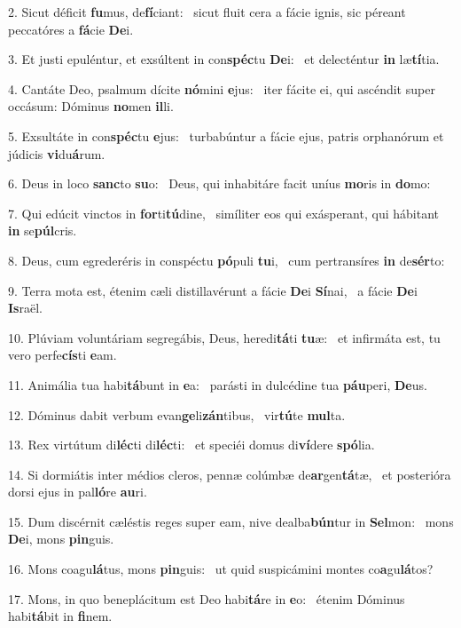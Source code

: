 2. Sicut déficit \textbf{fu}mus, de\textbf{fí}ciant: \ast\  sicut fluit cera a fácie ignis, sic péreant peccatóres a \textbf{fá}cie \textbf{De}i.\

3. Et justi epuléntur, et exsúltent in con\textbf{spéc}tu \textbf{De}i: \ast\  et delecténtur \textbf{in} læ\textbf{tí}tia.\

4. Cantáte Deo, psalmum dícite \textbf{nó}mini \textbf{e}jus: \ast\  iter fácite ei, qui ascéndit super occásum: Dóminus \textbf{no}men \textbf{il}li.\

5. Exsultáte in con\textbf{spéc}tu \textbf{e}jus: \ast\  turbabúntur a fácie ejus, patris orphanórum et júdicis \textbf{vi}du\textbf{á}rum.\

6. Deus in loco \textbf{sanc}to \textbf{su}o: \ast\  Deus, qui inhabitáre facit uníus \textbf{mo}ris in \textbf{do}mo:\

7. Qui edúcit vinctos in \textbf{for}ti\textbf{tú}dine, \ast\  simíliter eos qui exásperant, qui hábitant \textbf{in} se\textbf{púl}cris.\

8. Deus, cum egrederéris in conspéctu \textbf{pó}puli \textbf{tu}i, \ast\  cum pertransíres \textbf{in} de\textbf{sér}to:\

9. Terra mota est, étenim cæli distillavérunt a fácie \textbf{De}i \textbf{Sí}nai, \ast\  a fácie \textbf{De}i \textbf{Is}raël.\

10. Plúviam voluntáriam segregábis, Deus, heredi\textbf{tá}ti \textbf{tu}æ: \ast\  et infirmáta est, tu vero perfe\textbf{cís}ti \textbf{e}am.\

11. Animália tua habi\textbf{tá}bunt in \textbf{e}a: \ast\  parásti in dulcédine tua \textbf{páu}peri, \textbf{De}us.\

12. Dóminus dabit verbum evan\textbf{ge}li\textbf{zán}tibus, \ast\  vir\textbf{tú}te \textbf{mul}ta.\

13. Rex virtútum di\textbf{léc}ti di\textbf{léc}ti: \ast\  et speciéi domus di\textbf{ví}dere \textbf{spó}lia.\

14. Si dormiátis inter médios cleros, pennæ colúmbæ de\textbf{ar}gen\textbf{tá}tæ, \ast\  et posterióra dorsi ejus in pal\textbf{ló}re \textbf{au}ri.\

15. Dum discérnit cæléstis reges super eam, nive dealba\textbf{bún}tur in \textbf{Sel}mon: \ast\  mons \textbf{De}i, mons \textbf{pin}guis.\

16. Mons coagu\textbf{lá}tus, mons \textbf{pin}guis: \ast\  ut quid suspicámini montes co\textbf{a}gu\textbf{lá}tos?\

17. Mons, in quo beneplácitum est Deo habi\textbf{tá}re in \textbf{e}o: \ast\  étenim Dóminus habi\textbf{tá}bit in \textbf{fi}nem.\

